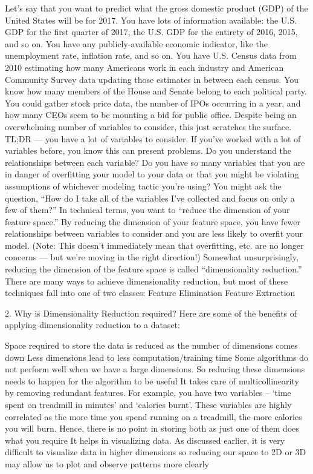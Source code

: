 Let’s say that you want to predict what the gross domestic product (GDP) of the United States will be for 2017. You have lots of information available: the U.S. GDP for the first quarter of 2017, the U.S. GDP for the entirety of 2016, 2015, and so on. You have any publicly-available economic indicator, like the unemployment rate, inflation rate, and so on. You have U.S. Census data from 2010 estimating how many Americans work in each industry and American Community Survey data updating those estimates in between each census. You know how many members of the House and Senate belong to each political party. You could gather stock price data, the number of IPOs occurring in a year, and how many CEOs seem to be mounting a bid for public office. Despite being an overwhelming number of variables to consider, this just scratches the surface.
TL;DR — you have a lot of variables to consider.
If you’ve worked with a lot of variables before, you know this can present problems. Do you understand the relationships between each variable? Do you have so many variables that you are in danger of overfitting your model to your data or that you might be violating assumptions of whichever modeling tactic you’re using?
You might ask the question, “How do I take all of the variables I’ve collected and focus on only a few of them?” In technical terms, you want to “reduce the dimension of your feature space.” By reducing the dimension of your feature space, you have fewer relationships between variables to consider and you are less likely to overfit your model. (Note: This doesn’t immediately mean that overfitting, etc. are no longer concerns — but we’re moving in the right direction!)
Somewhat unsurprisingly, reducing the dimension of the feature space is called “dimensionality reduction.” There are many ways to achieve dimensionality reduction, but most of these techniques fall into one of two classes:
Feature Elimination
Feature Extraction

2. Why is Dimensionality Reduction required?
Here are some of the benefits of applying dimensionality reduction to a dataset:

Space required to store the data is reduced as the number of dimensions comes down
Less dimensions lead to less computation/training time
Some algorithms do not perform well when we have a large dimensions. So reducing these dimensions needs to happen for the algorithm to be useful
It takes care of multicollinearity by removing redundant features. For example, you have two variables – ‘time spent on treadmill in minutes’ and ‘calories burnt’. These variables are highly correlated as the more time you spend running on a treadmill, the more calories you will burn. Hence, there is no point in storing both as just one of them does what you require
It helps in visualizing data. As discussed earlier, it is very difficult to visualize data in higher dimensions so reducing our space to 2D or 3D may allow us to plot and observe patterns more clearly

